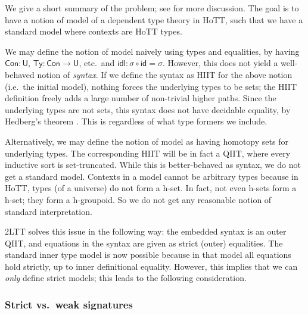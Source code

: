 \documentclass[12pt,a4paper,twoside,openany]{book}
\theoremstyle{remark}
\theoremstyle{definition}
\theoremstyle{theorem}
\newcommand{\ms}[1]{\mathsf{#1}}
\newcommand{\id}{\mathsf{id}}
\newcommand{\Con}{\mathsf{Con}}
\newcommand{\Ty}{\mathsf{Ty}}
\newcommand{\U}{\mathsf{U}}
\begin{document}
We give a short summary of the problem; see \cite[Section~4]{hiits} for more
discussion. The goal is to have a notion of model of a dependent type theory in
HoTT, such that we have a standard model where contexts are HoTT types.

We may define the notion of model naively using types and equalities, by having
$\Con : \U$, $\Ty : \Con \to \U$, etc.\ and $\ms{idl} : \sigma \circ \id =
\sigma$. However, this does not yield a well-behaved notion of \emph{syntax}. If
we define the syntax as HIIT for the above notion (i.e.\ the initial model),
nothing forces the underlying types to be sets; the HIIT definition freely adds
a large number of non-trivial higher paths. Since the underlying types are not
sets, this syntax does not have decidable equality, by Hedberg's theorem
\cite{hedberg}. This is regardless of what type formers we include.

Alternatively, we may define the notion of model as having homotopy sets for
underlying types. The corresponding HIIT will be in fact a QIIT, where every
inductive sort is set-truncated. While this is better-behaved as syntax, we do
not get a standard model. Contexts in a model cannot be arbitrary types because
in HoTT, types (of a universe) do not form a h-set. In fact, not even h-sets form
a h-set; they form a h-groupoid. So we do not get any reasonable notion of standard
interpretation.

2LTT solves this issue in the following way: the embedded syntax is an outer
QIIT, and equations in the syntax are given as strict (outer) equalities. The
standard inner type model is now possible because in that model all equations
hold strictly, up to inner definitional equality. However, this implies that we
can \emph{only} define strict models; this leads to the following consideration.

\subsubsection{Strict vs.\ weak signatures}
\end{document}
